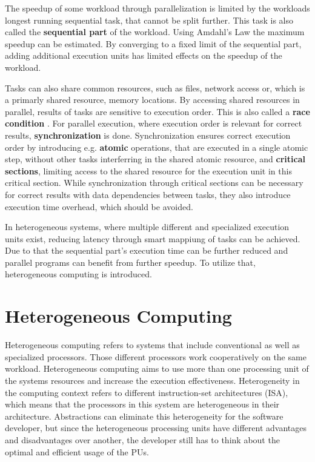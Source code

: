 The speedup of some workload through parallelization is limited by the workloads longest running sequential task, that cannot be split further. This task is also called the \textbf{sequential part} of the workload. Using Amdahl's Law \cite{amdahlValiditySingleProcessor1967} the maximum speedup can be estimated. By converging to a fixed limit of the sequential part, adding additional execution units has limited effects on the speedup of the workload.

Tasks can also share common resources, such as files, network access or, which is a primarly shared resource, memory locations. By accessing shared resources in parallel, results of tasks are sensitive to execution order. This is also called a \textbf{race condition} \cite{dijkstraCooperatingSequentialProcesses2002}. For parallel execution, where execution order is relevant for correct results, \textbf{synchronization} is done. Synchronization ensures correct execution order by introducing e.g. \textbf{atomic} operations, that are executed in a single atomic step, without other tasks interferring in the shared atomic resource, and \textbf{critical sections}, limiting access to the shared resource for the execution unit in this critical section. While synchronization through critical sections can be necessary for correct results with data dependencies between tasks, they also introduce execution time overhead, which should be avoided.

In heterogeneous systems, where multiple different and specialized execution units exist, reducing latency through smart mappiung of tasks can be achieved. Due to that the sequential part's execution time can be further reduced and parallel programs can benefit from further speedup. To utilize that, heterogeneous computing is introduced.

\section{Heterogeneous Computing}
Heterogeneous computing refers to systems that include conventional as well as specialized processors. Those different processors work cooperatively on the same workload. \cite{shanHeterogeneousProcessingStrategy2006} Heterogeneous computing aims to use more than one processing unit of the systems resources and increase the execution effectiveness. Heterogeneity in the computing context refers to different instruction-set architectures (ISA), which means that the processors in this system are heterogeneous in their architecture.
Abstractions can eliminate this heterogeneity for the software developer, but since the heterogeneous processing units have different advantages and disadvantages over another, the developer still has to think about the optimal and efficient usage of the PUs.

